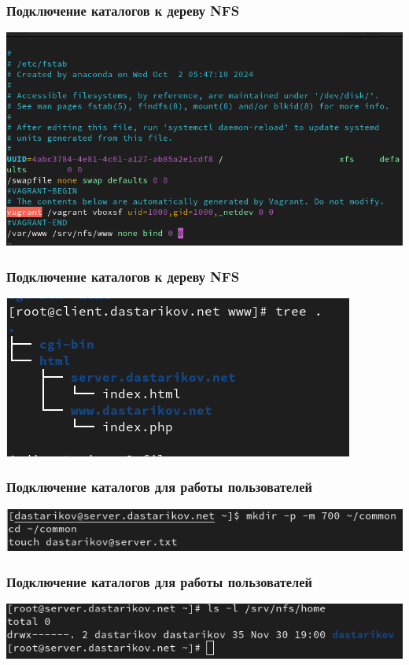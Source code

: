 \begin{frame}
\frametitle{Подключение каталогов к дереву NFS}
    \includegraphics[width=\textwidth]{../images/image19.png}
\end{frame}

\begin{frame}
\frametitle{Подключение каталогов к дереву NFS}
    \includegraphics[width=\textwidth]{../images/image20.png}
\end{frame}


\begin{frame}
\frametitle{Подключение каталогов для работы пользователей}
    \includegraphics[width=\textwidth]{../images/image21.png}
\end{frame}

\begin{frame}
\frametitle{Подключение каталогов для работы пользователей}
    \includegraphics[width=\textwidth]{../images/image22.png}
\end{frame}

